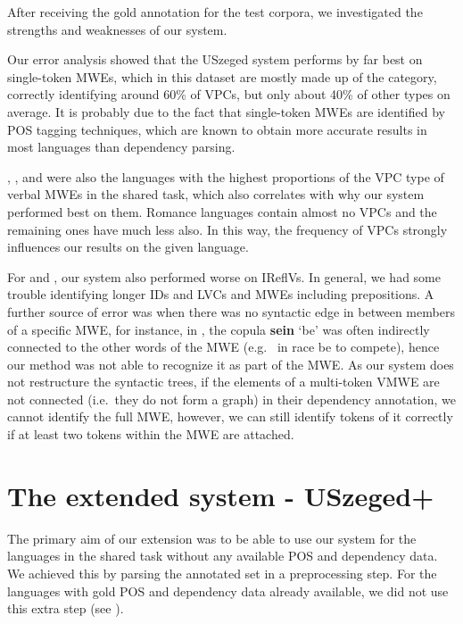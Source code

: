 \documentclass[output=paper,modfonts]{langscibook}
\begin{document}
After receiving the gold annotation for the test corpora, we investigated the strengths and weaknesses of our system. 


Our error analysis showed that the USzeged system performs by far best on single-token MWEs, which in this dataset are mostly made up of the  category, correctly identifying around 60\% of VPCs, but only about 40\% of other types on average. It is probably due to the fact that single-token MWEs are identified by POS tagging techniques, which are known to obtain more accurate results in most languages than dependency parsing.

, , and  were also the languages with the highest proportions of the VPC type of verbal MWEs in the shared task, which also correlates with why our system performed best on them. Romance languages contain almost no VPCs and the remaining ones have much less also. In this way, the frequency of VPCs strongly influences our results on the given language.

For  and , our system also performed worse on IReflVs. In general, we had some trouble identifying longer IDs and LVCs and MWEs including prepositions. A further source of error was when there was no syntactic edge in between members of a specific MWE, for instance, in , the copula \textbf{sein} `be’ was often indirectly connected to the other words of the MWE (e.g.~ {in race be} {to compete}), hence our method was not able to recognize it as part of the MWE. As our system does not restructure the syntactic trees, if the elements of a multi-token VMWE are not connected (i.e.~they do not form a graph) in their dependency annotation, we cannot identify the full MWE, however, we can still identify tokens of it correctly if at least two tokens within the MWE are attached.

\section{The extended system - USzeged+}

The primary aim of our extension was to be able to use our system for the languages in the shared task without any available POS and dependency data. We achieved this by parsing the annotated set in a preprocessing step. For the languages with gold POS and dependency data already available, we did not use this extra step (see ).
\end{document}
